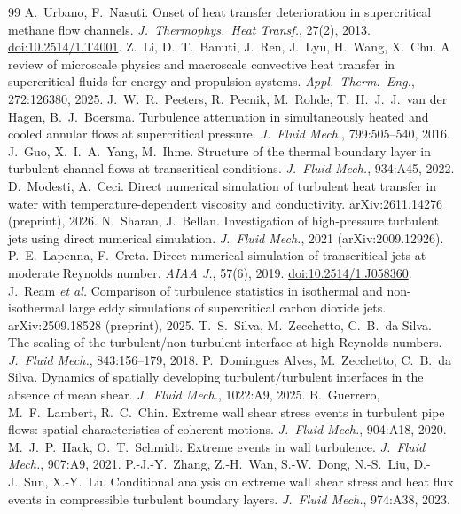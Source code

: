 \documentclass[11pt]{article}
\begin{document}
\begin{thebibliography}{99}
 A.\ Urbano, F.\ Nasuti. Onset of heat transfer deterioration in supercritical methane flow channels. \emph{J.\ Thermophys.\ Heat Transf.}, 27(2), 2013. \href{https://doi.org/10.2514/1.T4001}{doi:10.2514/1.T4001}.
 Z.\ Li, D.\ T.\ Banuti, J.\ Ren, J.\ Lyu, H.\ Wang, X.\ Chu. A review of microscale physics and macroscale convective heat transfer in supercritical fluids for energy and propulsion systems. \emph{Appl.\ Therm.\ Eng.}, 272:126380, 2025.
 J.\ W.\ R.\ Peeters, R.\ Pecnik, M.\ Rohde, T.\ H.\ J.\ J.\ van der Hagen, B.\ J.\ Boersma. Turbulence attenuation in simultaneously heated and cooled annular flows at supercritical pressure. \emph{J.\ Fluid Mech.}, 799:505--540, 2016.
 J.\ Guo, X.\ I.\ A.\ Yang, M.\ Ihme. Structure of the thermal boundary layer in turbulent channel flows at transcritical conditions. \emph{J.\ Fluid Mech.}, 934:A45, 2022.
 D.\ Modesti, A.\ Ceci. Direct numerical simulation of turbulent heat transfer in water with temperature-dependent viscosity and conductivity. arXiv:2611.14276 (preprint), 2026.
 N.\ Sharan, J.\ Bellan. Investigation of high-pressure turbulent jets using direct numerical simulation. \emph{J.\ Fluid Mech.}, 2021 (arXiv:2009.12926).
 P.\ E.\ Lapenna, F.\ Creta. Direct numerical simulation of transcritical jets at moderate Reynolds number. \emph{AIAA J.}, 57(6), 2019. \href{https://doi.org/10.2514/1.J058360}{doi:10.2514/1.J058360}.
 J.\ Ream \emph{et al.} Comparison of turbulence statistics in isothermal and non-isothermal large eddy simulations of supercritical carbon dioxide jets. arXiv:2509.18528 (preprint), 2025.
 T.\ S.\ Silva, M.\ Zecchetto, C.\ B.\ da Silva. The scaling of the turbulent/non-turbulent interface at high Reynolds numbers. \emph{J.\ Fluid Mech.}, 843:156--179, 2018.
 P.\ Domingues Alves, M.\ Zecchetto, C.\ B.\ da Silva. Dynamics of spatially developing turbulent/turbulent interfaces in the absence of mean shear. \emph{J.\ Fluid Mech.}, 1022:A9, 2025.
 B.\ Guerrero, M.\ F.\ Lambert, R.\ C.\ Chin. Extreme wall shear stress events in turbulent pipe flows: spatial characteristics of coherent motions. \emph{J.\ Fluid Mech.}, 904:A18, 2020.
 M.\ J.\ P.\ Hack, O.\ T.\ Schmidt. Extreme events in wall turbulence. \emph{J.\ Fluid Mech.}, 907:A9, 2021.
 P.-J.-Y.\ Zhang, Z.-H.\ Wan, S.-W.\ Dong, N.-S.\ Liu, D.-J.\ Sun, X.-Y.\ Lu. Conditional analysis on extreme wall shear stress and heat flux events in compressible turbulent boundary layers. \emph{J.\ Fluid Mech.}, 974:A38, 2023.

\end{thebibliography}
\end{document}
